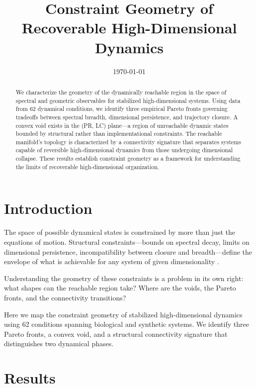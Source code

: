 \documentclass{chaos-article}
\begin{document}
\title{Constraint Geometry of Recoverable High-Dimensional Dynamics}

\author{}

\date{\today}

\begin{abstract}
We characterize the geometry of the dynamically reachable region in the space of spectral and geometric observables for stabilized high-dimensional systems. Using data from 62 dynamical conditions, we identify three empirical Pareto fronts governing tradeoffs between spectral breadth, dimensional persistence, and trajectory closure. A convex void exists in the (PR, LC) plane---a region of unreachable dynamic states bounded by structural rather than implementational constraints. The reachable manifold's topology is characterized by a connectivity signature that separates systems capable of reversible high-dimensional dynamics from those undergoing dimensional collapse. These results establish constraint geometry as a framework for understanding the limits of recoverable high-dimensional organization.
\end{abstract}

\maketitle

\section{Introduction}

The space of possible dynamical states is constrained by more than just the equations of motion. Structural constraints---bounds on spectral decay, limits on dimensional persistence, incompatibility between closure and breadth---define the envelope of what is achievable for any system of given dimensionality \cite{constraint_satisfaction, spectral_geometry}.

Understanding the geometry of these constraints is a problem in its own right: what shapes can the reachable region take? Where are the voids, the Pareto fronts, and the connectivity transitions?

Here we map the constraint geometry of stabilized high-dimensional dynamics using 62 conditions spanning biological and synthetic systems. We identify three Pareto fronts, a convex void, and a structural connectivity signature that distinguishes two dynamical phases.

\section{Results}
\end{document}
